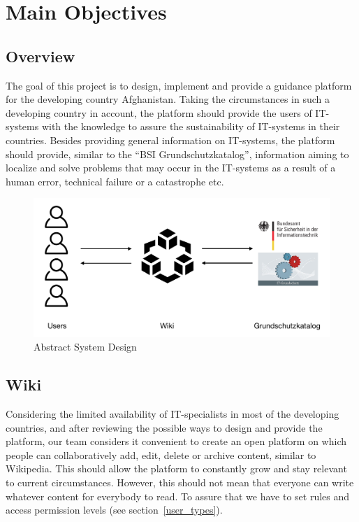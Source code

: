 \chapter{Main Objectives}


\section{Overview}
The goal of this project is to design, implement and provide a guidance platform for the developing country Afghanistan. 
Taking the circumstances in such a developing country in account, the platform should provide the users of IT-systems with the knowledge to assure the sustainability of IT-systems in their countries. 
Besides providing general information on IT-systems, the platform should provide, similar to the “BSI Grundschutzkatalog”, information aiming to localize and solve problems that may occur in the IT-systems as a result of a human error, technical failure or a catastrophe etc. 
\\
\begin{figure}[h] 
    \centering
    \includegraphics[scale=0.3]{Pictures/ConceptSketch}
    \caption{Abstract System Design}
\end{figure}


\section{Wiki} 
Considering the limited availability of IT-specialists in most of the developing countries, and after reviewing the possible ways to design and provide the platform, our team considers it convenient to create an open platform on which people can collaboratively add, edit, delete or archive content, similar to Wikipedia. 
This should allow the platform to constantly grow and stay relevant to current circumstances. 
However, this should not mean that everyone can write whatever content for everybody to read. 
To assure that we have to set rules and access permission levels (see section~\ref{user_types}). 

